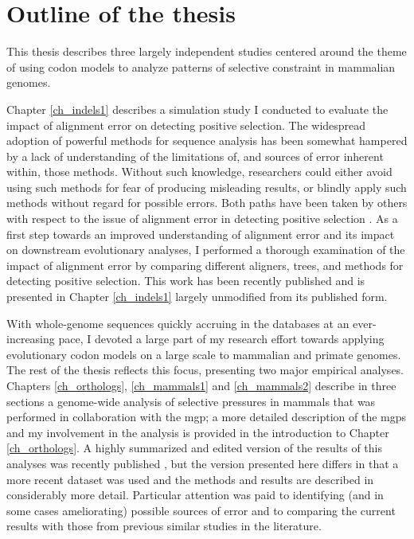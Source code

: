 \section{Outline of the thesis}

This thesis describes three largely independent studies centered
around the theme of using codon models to analyze patterns of
selective constraint in mammalian genomes.

Chapter \ref{ch_indels1} describes a simulation study I conducted to
evaluate the impact of alignment error on detecting \sw positive
selection. The widespread adoption of powerful methods for sequence
analysis has been somewhat hampered by a lack of understanding of the
limitations of, and sources of error inherent within, those
methods. Without such knowledge, researchers could either avoid using
such methods for fear of producing misleading results, or blindly
apply such methods without regard for possible errors. Both paths have
been taken by others with respect to the issue of alignment error in
detecting positive selection
\citep{Thompson1994,Bakewell2007,Studer2008,MarkovaRaina2011}. As a
first step towards an improved understanding of alignment error and
its impact on downstream evolutionary analyses, I performed a thorough
examination of the impact of alignment error by comparing different
aligners, trees, and methods for detecting positive selection. This
work has been recently published \citep{Jordan2011} and is presented
in Chapter \ref{ch_indels1} largely unmodified from its published
form.

With whole-genome sequences quickly accruing in the databases at an
ever-increasing pace, I devoted a large part of my research effort
towards applying evolutionary codon models on a large scale to
mammalian and primate genomes. The rest of the thesis reflects this
focus, presenting two major empirical analyses. Chapters
\ref{ch_orthologs}, \ref{ch_mammals1} and \ref{ch_mammals2} describe
in three sections a genome-wide analysis of \sw selective pressures in
mammals that was performed in collaboration with the \acf{mgp}; a more
detailed description of the \acp{mgp} and my involvement in the
analysis is provided in the introduction to Chapter
\ref{ch_orthologs}. A highly summarized and edited version of the
results of this analyses was recently published
\citep{LindbladToh2011}, but the version presented here differs in
that a more recent dataset was used and the methods and results are
described in considerably more detail. Particular attention was paid
to identifying (and in some cases ameliorating) possible sources of
error and to comparing the current results with those from previous
similar studies in the literature.

